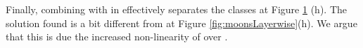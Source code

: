 \begin{figure}
{{    %
    }
    \parbox{.195\textwidth}{%
    }
  }

    \caption{\SepUnitPoint}
    \label{fig:moonsUnitpointwise}
\end{figure}

Finally, combining \SepUnit with \SepPoint in \SepUnitPoint effectively separates the classes at Figure \ref{fig:moonsUnitpointwise} (h). The solution found is a bit different from \SepLayer at Figure \ref{fig:moonsLayerwise}(h). We argue that this is due the increased non-linearity of \SepUnit over \SepLayer.

